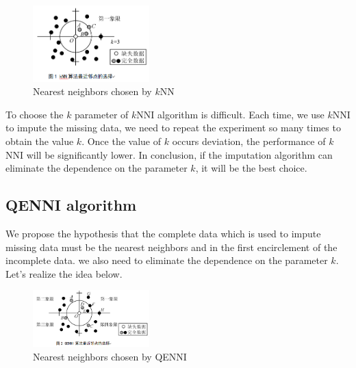 \documentclass[print]{jicspack}
\begin{document}
\begin{figure}[h]
\centering
\includegraphics[angle=0, width=0.4\textwidth]{figure1.png}
\caption{Nearest neighbors chosen by $k$NN}
\label{fig:figure1}
\end{figure}

To choose the $k$ parameter of $k$NNI algorithm is difficult. Each time, we use $k$NNI to impute the missing data, we need to repeat the experiment so many times to obtain the value $k$. Once the value of $k$ occurs deviation, the performance of $k$NNI will be significantly lower. In conclusion, if the imputation algorithm can eliminate the dependence on the parameter $k$, it will be the best choice.

\subsection{QENNI algorithm}
\label{2.3}
We propose the hypothesis that the complete data which is used to impute missing data must be the nearest neighbors and in the first encirclement of the incomplete data. we also need to eliminate the dependence on the parameter $k$. Let's realize the idea below.

\begin{figure}[h]
\centering
\includegraphics[angle=0, width=0.4\textwidth]{figure2.png}
\caption{Nearest neighbors chosen by QENNI}
\label{fig:figure2}
\end{figure}
\end{document}
